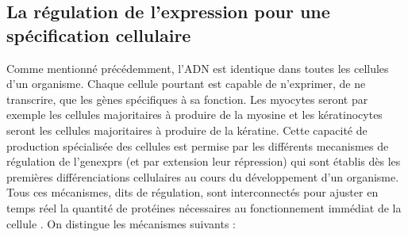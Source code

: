 \subsection{La régulation de l'expression pour une spécification cellulaire}

Comme mentionné précédemment, l'\acrshort{ADN} est identique dans toutes les cellules d'un \gls{organisme}. Chaque cellule pourtant est capable de n'exprimer, de ne transcrire, que les gènes spécifiques à sa fonction. Les myocytes seront par exemple les cellules majoritaires à produire de la myosine et les kératinocytes seront les cellules majoritaires à produire de la kératine. Cette capacité de production spécialisée des cellules est permise par les différents \glspl{mecanisme} de régulation de l'\glspl{genexpr} (et par extension leur répression) qui sont établis dès les premières différenciations cellulaires au cours du développement d'un organisme. Tous ces mécanismes, dits de régulation, sont interconnectés pour ajuster en temps réel la quantité de protéines nécessaires au fonctionnement immédiat de la cellule \cite{Weake2010Jun}. On distingue les mécanismes suivants : 
